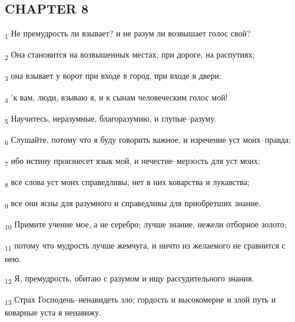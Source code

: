 \subsection{CHAPTER 8}
\begin{tcolorbox}
\textsubscript{1} Не премудрость ли взывает? и не разум ли возвышает голос свой?
\end{tcolorbox}
\begin{tcolorbox}
\textsubscript{2} Она становится на возвышенных местах, при дороге, на распутиях;
\end{tcolorbox}
\begin{tcolorbox}
\textsubscript{3} она взывает у ворот при входе в город, при входе в двери:
\end{tcolorbox}
\begin{tcolorbox}
\textsubscript{4} 'к вам, люди, взываю я, и к сынам человеческим голос мой!
\end{tcolorbox}
\begin{tcolorbox}
\textsubscript{5} Научитесь, неразумные, благоразумию, и глупые--разуму.
\end{tcolorbox}
\begin{tcolorbox}
\textsubscript{6} Слушайте, потому что я буду говорить важное, и изречение уст моих--правда;
\end{tcolorbox}
\begin{tcolorbox}
\textsubscript{7} ибо истину произнесет язык мой, и нечестие--мерзость для уст моих;
\end{tcolorbox}
\begin{tcolorbox}
\textsubscript{8} все слова уст моих справедливы; нет в них коварства и лукавства;
\end{tcolorbox}
\begin{tcolorbox}
\textsubscript{9} все они ясны для разумного и справедливы для приобретших знание.
\end{tcolorbox}
\begin{tcolorbox}
\textsubscript{10} Примите учение мое, а не серебро; лучше знание, нежели отборное золото;
\end{tcolorbox}
\begin{tcolorbox}
\textsubscript{11} потому что мудрость лучше жемчуга, и ничто из желаемого не сравнится с нею.
\end{tcolorbox}
\begin{tcolorbox}
\textsubscript{12} Я, премудрость, обитаю с разумом и ищу рассудительного знания.
\end{tcolorbox}
\begin{tcolorbox}
\textsubscript{13} Страх Господень--ненавидеть зло; гордость и высокомерие и злой путь и коварные уста я ненавижу.
\end{tcolorbox}
